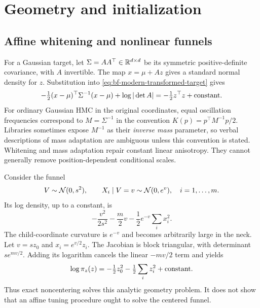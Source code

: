 \section{Geometry and initialization}
\label{sec:bf-modern-geometry}

\subsection{Affine whitening and nonlinear funnels}

For a Gaussian target, let $\Sigma=AA^\top\in\mathbb{R}^{d\times d}$ be its symmetric
positive-definite covariance, with $A$ invertible. The map $x=\mu+Az$
gives a standard normal density for $z$. Substitution into
\eqref{eq:bf-modern-transformed-target} gives
\begin{equation}
 -\tfrac12(x-\mu)^\top\Sigma^{-1}(x-\mu)
       +\log|\det A|= -\tfrac12z^\top z+\hbox{constant}.
 \label{eq:bf-modern-affine-whitening}
\end{equation}
For ordinary Gaussian HMC in the original coordinates, equal oscillation
frequencies correspond to $M=\Sigma^{-1}$ in the convention
$K(p)=p^\top M^{-1}p/2$. Libraries sometimes expose $M^{-1}$ as their
\emph{inverse mass} parameter, so verbal descriptions of mass adaptation are
ambiguous unless this convention is stated. Whitening and mass adaptation
repair constant linear anisotropy. They cannot generally remove
position-dependent conditional scales.

Consider the funnel
\begin{equation}
 V\sim\mathcal{N}(0,s^2),\qquad X_i\mid V=v\sim\mathcal{N}(0,e^v),
       \quad i=1,\ldots,m.
 \label{eq:bf-modern-funnel}
\end{equation}
Its log density, up to a constant, is
\begin{equation}
 -\frac{v^2}{2s^2}-\frac m2v-\frac12e^{-v}\sum_i x_i^2.
 \label{eq:bf-modern-funnel-centered}
\end{equation}
The child-coordinate curvature is $e^{-v}$ and becomes arbitrarily large in
the neck. Let $v=sz_0$ and $x_i=e^{v/2}z_i$. The Jacobian is block
triangular, with determinant $s e^{mv/2}$. Adding its logarithm cancels the
linear $-mv/2$ term and yields
\begin{equation}
 \log\pi_z(z)=-\tfrac12z_0^2-\tfrac12\sum_i z_i^2+\hbox{constant}.
 \label{eq:bf-modern-funnel-whitened}
\end{equation}
Thus exact noncentering solves this analytic geometry problem. It does not
show that an affine tuning procedure ought to solve the centered funnel.

